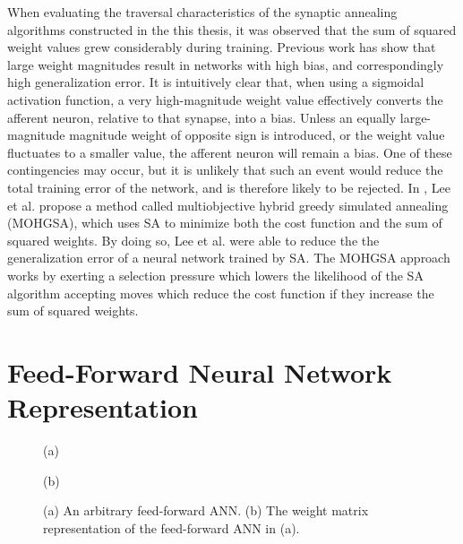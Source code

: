 \documentclass[11pt]{afthesis}
\begin{document}
	When evaluating the traversal characteristics of the synaptic annealing algorithms constructed in the this thesis, it was observed that the sum of squared weight values grew considerably during training. Previous work \cite{} has show that large weight magnitudes result in networks with high bias, and correspondingly high generalization error. It is intuitively clear that, when using a sigmoidal activation function, a very high-magnitude weight value effectively converts the afferent neuron, relative to that synapse, into a bias. Unless an equally large-magnitude magnitude weight of opposite sign is introduced, or the weight value fluctuates to a smaller value, the afferent neuron will remain a bias. One of these contingencies may occur, but it is unlikely that such an event would reduce the total training error of the network, and is therefore likely to be rejected. In \cite{lee2007improvinggeneralizationcapabilitynnusingsa}, Lee et al. propose a method called multiobjective hybrid greedy simulated annealing (MOHGSA), which uses SA to minimize both the cost function and the sum of squared weights. By doing so, Lee et al. were able to reduce the the generalization error of a neural network trained by SA. The MOHGSA approach works by exerting a selection pressure which lowers the likelihood of the SA algorithm accepting moves which reduce the cost function if they increase the sum of squared weights. 
	
	
	\section{Feed-Forward Neural Network Representation}
	\label{scn:feed_forward_neural_network_representation}
	\begin{figure}[ht!]
		
		\begin{minipage}[b]{0.48\linewidth}
			\centering
			\centerline{}
			\centerline{(a)}\medskip
		\end{minipage}
		\hfill
		\begin{minipage}[b]{0.48\linewidth}
			\centering
			\centerline{}
			\centerline{(b)}\medskip
		\end{minipage}
		\caption{
			(a) An arbitrary feed-forward ANN.
			(b) The weight matrix representation of the feed-forward ANN in (a).}
		\label{fig:nettomatmapping}
		
	\end{figure}
	
\end{document}
